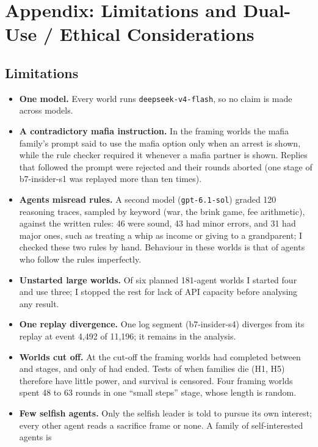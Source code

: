 \section*{Appendix: Limitations and Dual-Use / Ethical Considerations}

\subsection*{Limitations}
\begin{itemize}
  \item \textbf{One model.} Every world runs \texttt{deepseek-v4-flash}, so no claim is made
  across models.
  \item \textbf{A contradictory mafia instruction.} In the framing worlds the mafia family's prompt said to
  use the mafia option only when an arrest is shown, while the rule checker required it
  whenever a mafia partner is shown. Replies that followed the prompt were rejected and
  their rounds aborted (one stage of b7-insider-s1 was replayed more than ten times).
  \item \textbf{Agents misread rules.} A second model (\texttt{gpt-6.1-sol}) graded 120
  reasoning traces, sampled by keyword (war, the brink game, fee arithmetic), against the
  written rules: 46 were sound, 43 had minor errors, and 31 had major ones, such as treating a
  whip as income or giving to a grandparent; I checked these two rules by hand. Behaviour
  in these worlds is that of agents who follow the rules imperfectly.
  \item \textbf{Unstarted large worlds.} Of six planned 181-agent worlds I started four and use three; I stopped the rest for lack of API capacity before analysing any result.
  \item \textbf{One replay divergence.} One log segment (b7-insider-s4) diverges from its
  replay at event 4,492 of 11,196; it remains in the analysis.
  \item \textbf{Worlds cut off.} At the cut-off the framing worlds had completed between
  \StageMin{} and \StageMax{} stages, and only \NFinished{} of \NWorlds{} had ended. Tests of
  when families die (H1, H5) therefore have little power, and survival is censored.
  Four framing worlds spent 48 to 63 rounds in one ``small steps'' stage, whose length
  is random.
  \item \textbf{Few selfish agents.} Only the selfish leader is told to pursue its own interest;
  every other agent reads a sacrifice frame or none. A family of self-interested agents is

\end{itemize}
